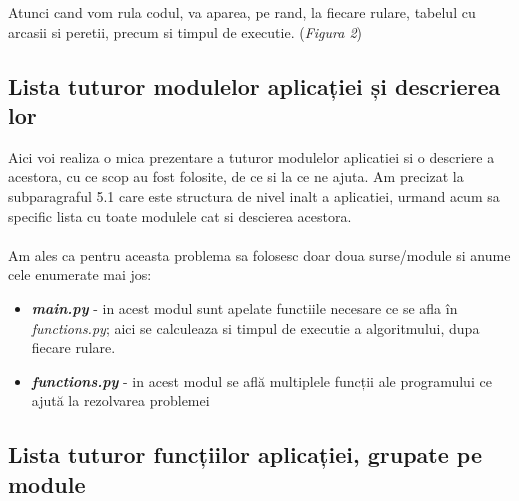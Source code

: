 \documentclass{article}
\begin{document}
Atunci cand vom rula codul, va aparea, pe rand, la fiecare rulare, tabelul cu arcasii si peretii, precum si timpul de executie. (\textit{Figura 2}) \\


\newpage

\subsection{Lista tuturor modulelor aplicației și descrierea lor}

\hspace{0.5cm} Aici voi realiza o mica prezentare a tuturor modulelor aplicatiei si o descriere a acestora, cu ce scop au fost folosite, de ce si la ce ne ajuta.
Am precizat la subparagraful 5.1 care este structura de nivel inalt a aplicatiei, urmand acum sa specific lista cu toate modulele cat si descierea acestora.\\\\

\hspace{0.5cm} Am ales ca pentru aceasta problema sa folosesc doar doua surse/module si anume cele enumerate mai jos: \\

\begin{itemize}

        \item \textit{\textbf{main.py}} - in acest modul sunt apelate functiile necesare ce se afla în \textsl{functions.py}; aici se calculeaza si timpul de executie a algoritmului, dupa fiecare rulare.
        \item \textit{\textbf{functions.py}} - in acest modul se află multiplele funcții ale programului ce ajută la rezolvarea problemei
\end{itemize}       

\newpage 

\subsection{Lista tuturor funcțiilor aplicației, grupate pe module}
\end{document}
